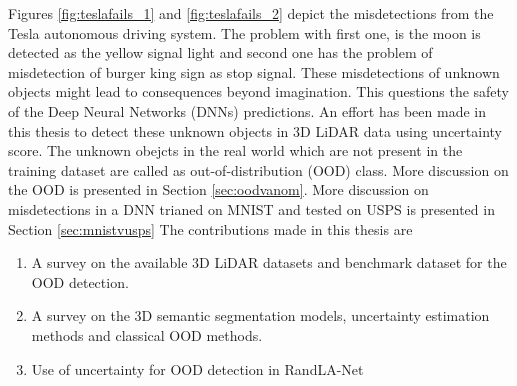 Figures \ref{fig:teslafails_1} and \ref{fig:teslafails_2} depict the misdetections from the Tesla autonomous driving system.
The problem with first one, is the moon is detected as the yellow signal light and second one has the problem of misdetection of burger king sign as stop signal.
These misdetections of unknown objects might lead to consequences beyond imagination.
This questions the safety of the Deep Neural Networks (DNNs) predictions.
An effort has been made in this thesis to detect these unknown objects in 3D LiDAR data using uncertainty score.
The unknown obejcts in the real world which are not present in the training dataset are called as out-of-distribution (OOD) class. 
More discussion on the OOD is presented in Section \ref{sec:oodvanom}.
More discussion on misdetections in a DNN trianed on MNIST and tested on USPS is presented in Section \ref{sec:mnistvusps}
The contributions made in this thesis are
\begin{enumerate}
    \item A survey on the available 3D LiDAR datasets and benchmark dataset for the OOD detection.
    \item A survey on the 3D semantic segmentation models, uncertainty estimation methods and classical OOD methods.
    \item Use of uncertainty for OOD detection in RandLA-Net
\end{enumerate}


